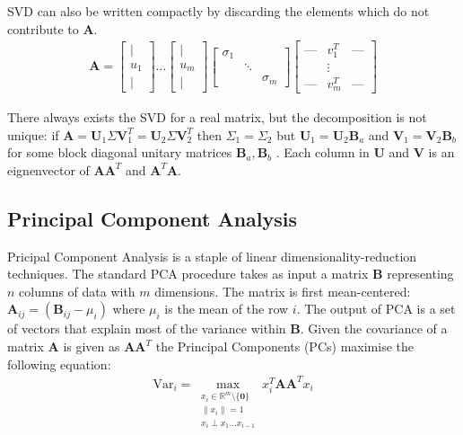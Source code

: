 SVD can also be written compactly by discarding the elements which do not
contribute to $\mathbf{A}$.
\begin{align}
\mathbf{A} = \begin{bmatrix} \mid \\ u_1 \\ \mid \end{bmatrix} \dots
    \begin{bmatrix} \mid \\ u_m \\ \mid \end{bmatrix} \begin{bmatrix} \sigma_1 &
        & \\ & \ddots & \\ & & \sigma_m \end{bmatrix} \begin{bmatrix} \text{---}
& v_1^T & \text{---} \\ & \vdots & \\ \text{---} & v_m^T & \text{---}
\end{bmatrix}
\end{align}

There always exists the SVD for a real matrix, but the decomposition is not
unique: if $\mathbf{A} = \mathbf{U}_1\Sigma\mathbf{V}_1^T =
\mathbf{U}_2\Sigma\mathbf{V}_2^T$ then $\Sigma_1 = \Sigma_2$ but $\mathbf{U}_1 =
\mathbf{U}_2\mathbf{B}_a$ and $\mathbf{V}_1 = \mathbf{V}_2\mathbf{B}_b$ for some
block diagonal unitary matrices $\mathbf{B}_a, \mathbf{B}_b$ \cite{}. Each
column in $\mathbf{U}$ and $\mathbf{V}$ is an eignenvector of
$\mathbf{AA}^T$ and $\mathbf{A}^T\mathbf{A}$.

\subsection{Principal Component Analysis}
Pricipal Component Analysis is a staple of linear dimensionality-reduction
techniques. The standard PCA procedure takes as input a matrix $\mathbf{B}$
representing $n$ columns of data with $m$ dimensions. The matrix is first
mean-centered: $\mathbf{A}_{ij} = (\mathbf{B}_{ij} - \mu_i)$ where $\mu_i$ is
the mean of the row $i$. The output of PCA is a set of vectors that explain most
of the variance within $\mathbf{B}$. Given the covariance of a matrix
$\mathbf{A}$ is given as $\mathbf{AA}^T$ the Principal Components (PCs) maximise
the following equation:
\begin{align}
\text{Var}_i = \max_{\substack{x_i \in \mathbb{R}^m \setminus \{\mathbf{0}\} \\
    \|x_i\|=1 \\ x_i \perp x_1 \dots x_{i-1}}} x_i^T \mathbf{A} \mathbf{A}^T x_i
\end{align}

